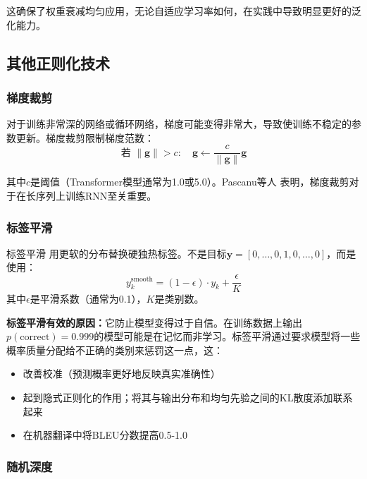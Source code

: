 这确保了权重衰减均匀应用，无论自适应学习率如何，在实践中导致明显更好的泛化能力。

\subsection{其他正则化技术}

\subsubsection{梯度裁剪}

对于训练非常深的网络或循环网络，梯度可能变得非常大，导致使训练不稳定的参数更新。梯度裁剪限制梯度范数：
\begin{equation}
\text{若 } \|\mathbf{g}\| > c: \quad \mathbf{g} \leftarrow \frac{c}{\|\mathbf{g}\|}\mathbf{g}
\end{equation}

其中$c$是阈值（Transformer模型通常为1.0或5.0）。Pascanu等人 \cite{pascanu2013difficulty}表明，梯度裁剪对于在长序列上训练RNN至关重要。

\subsubsection{标签平滑}

标签平滑 \cite{szegedy2016rethinking}用更软的分布替换硬独热标签。不是目标$\mathbf{y} = [0, \ldots, 0, 1, 0, \ldots, 0]$，而是使用：
\begin{equation}
y_k^{\text{smooth}} = (1 - \epsilon)\cdot y_k + \frac{\epsilon}{K}
\end{equation}
其中$\epsilon$是平滑系数（通常为0.1），$K$是类别数。

\textbf{标签平滑有效的原因：}它防止模型变得过于自信。在训练数据上输出$p(\text{correct}) = 0.999$的模型可能是在记忆而非学习。标签平滑通过要求模型将一些概率质量分配给不正确的类别来惩罚这一点，这：
\begin{itemize}
    \item 改善校准（预测概率更好地反映真实准确性）
    \item 起到隐式正则化的作用；\cite{muller2019when}将其与输出分布和均匀先验之间的KL散度添加联系起来
    \item 在机器翻译中将BLEU分数提高0.5-1.0
\end{itemize}

\subsubsection{随机深度}

